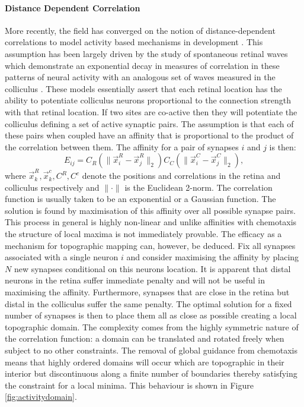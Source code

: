 \paragraph{Distance Dependent Correlation \label{sec:distancecorellation} }
More recently, the field has converged on the notion of distance-dependent correlations to model activity based mechanisms in development \cite{Grimbert2012-cd, Triplett2011-jk}. This assumption has been largely driven by the study of spontaneous retinal waves which demonstrate an exponential decay in measures of correlation in these patterns of neural activity with an analogous set of waves measured in the colliculus \cite{Stafford2009, Ackman2012-uu}. These models essentially assert that each retinal location has the ability to potentiate colliculus neurons proportional to the connection strength with that retinal location. If two sites are co-active then they will potentiate the colliculus defining a set of active synaptic pairs. The assumption is that each of these pairs when coupled have an affinity that is proportional to the product of the correlation between them. The affinity for a pair of synapses $i$ and $j$ is then:
\begin{equation}
E_{ij} = C_R\left(\lVert \vec{x}^R_i - \vec{x}^R_j \rVert_2\right)C_C\left(\lVert \vec{x}^C_i - \vec{x}^C_j \rVert_2\right),
\end{equation}
where $\vec{x}_k^R, \vec{x}_k^c, C^R, C^c$ denote the positions and correlations in the retina and colliculus respectively and $\lVert \cdot \rVert$ is the Euclidean 2-norm. The correlation function is usually taken to be an exponential or a Gaussian function. The solution is found by maximisation of this affinity over all possible synapse pairs. This process in general is highly non-linear and unlike affinities with chemotaxis the structure of local maxima is not immediately provable. The efficacy as a mechanism for topographic mapping can, however, be deduced. Fix all synapses associated with a single neuron $i$ and consider maximising the affinity by placing $N$ new synapses conditional on this neurons location. It is apparent that distal neurons in the retina suffer immediate penalty and will not be useful in maximising the affinity. Furthermore, synapses that are close in the retina but distal in the colliculus suffer the same penalty. The optimal solution for a fixed number of synapses is then to place them all as close as possible creating a local topographic domain. The complexity comes from the highly symmetric nature of the correlation function: a domain can be translated and rotated freely when subject to no other constraints. The removal of global guidance from chemotaxis means that highly ordered domains will occur which are topographic in their interior but discontinuous along a finite number of boundaries thereby satisfying the constraint for a local minima. This behaviour is shown in Figure \ref{fig:activitydomain}.

